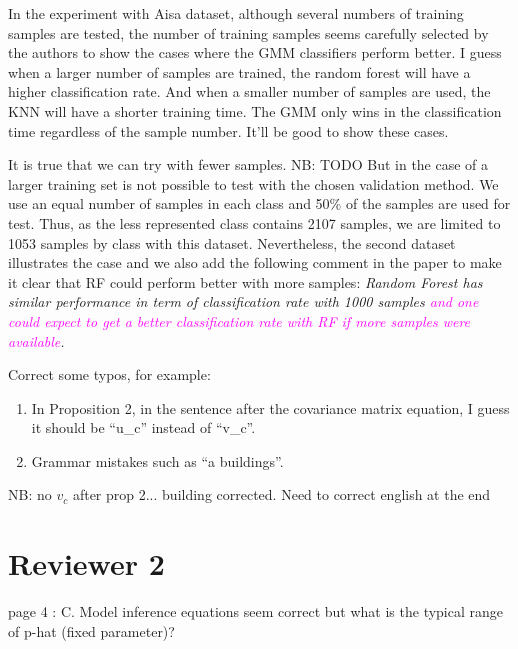 \documentclass[a4paper,10pt,DIV=16]{scrartcl}
\newcommand{\rev}[1]{\textcolor{magenta}{#1}}
\begin{document}
\begin{revbox}
  In the experiment with Aisa dataset, although several numbers of training samples are tested, the number of training samples seems carefully selected by the authors to show the cases where the GMM classifiers perform better. I guess when a larger number of samples are trained, the random forest will have a higher classification rate. And when a smaller number of samples are used, the KNN will have a shorter training time. The GMM only wins in the classification time regardless of the sample number. It’ll be good to show these cases.
  \begin{resbox}
    It is true that we can try with fewer samples. NB: TODO
    But in the case of a larger training set is not possible to test with the chosen validation method. We use an equal number of samples in each class and 50\% of the samples are used for test. Thus, as the less represented class contains 2107 samples, we are limited to 1053 samples by class with this dataset. Nevertheless, the second dataset illustrates the case and we also add the following comment in the paper to make it clear that RF could perform better with more samples:
    \emph{Random Forest has similar performance in term of classification rate with 1000 samples \rev{ and one could expect to get a better classification rate with RF if more samples were available}.}
  \end{resbox}
\end{revbox}

\begin{revbox}
  Correct some typos, for example:
  \begin{enumerate}
    \item In Proposition 2, in the sentence after the covariance matrix equation, I guess it should be ``u\_c'' instead of ``v\_c''.
    \item Grammar mistakes such as ``a buildings''.
  \end{enumerate}
  \begin{resbox}
    NB:
    no $v_c$ after prop 2...
    building corrected. Need to correct english at the end
  \end{resbox}
\end{revbox}


\section{Reviewer 2}

\begin{revbox}
  page 4 :  C. Model inference equations seem correct  but what is the
  typical range of p-hat (fixed parameter)?
  \begin{resbox}

  \end{resbox}
\end{revbox}
\end{document}
